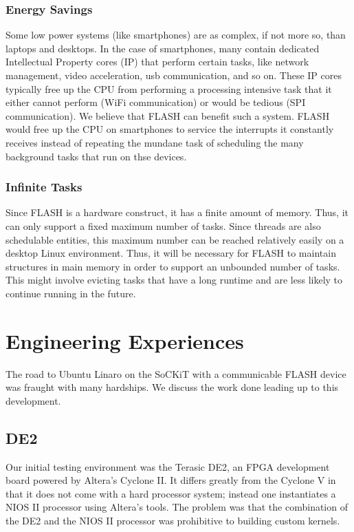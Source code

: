 \documentclass{sig-alternate-10pt}
\begin{document}
\subsubsection{Energy Savings}
Some low power systems (like smartphones) are as complex, if not more so,
than laptops and desktops. In the case of smartphones, many contain
dedicated Intellectual Property cores (IP) that perform certain tasks, like
network management, video acceleration, usb communication, and so on. These IP
cores typically free up the CPU from performing a processing intensive task
that it either cannot perform (WiFi communication) or would be tedious (SPI
communication). We believe that FLASH can benefit such a system. FLASH would
free up the CPU on smartphones to service the interrupts it constantly
receives instead of repeating the mundane task of scheduling the many
background tasks that run on thse devices.

\subsubsection{Infinite Tasks}
Since FLASH is a hardware construct, it has a finite amount of memory. Thus,
it can only support a fixed maximum number of tasks. Since threads are also
schedulable entities, this maximum number can be reached relatively easily
on a desktop Linux environment. Thus, it will be necessary for FLASH to
maintain structures in main memory in order to support an unbounded number
of tasks.  This might involve evicting tasks that have a long runtime and
are less likely to continue running in the future.


\section{Engineering Experiences}
\label{sec:eng_exp}
The road to Ubuntu Linaro on the SoCKiT with a communicable FLASH device was fraught with many hardships. We discuss the work done leading up to this development.
\subsection{DE2}
Our initial testing environment was the Terasic DE2, an FPGA development board powered by Altera's Cyclone II. It differs greatly from the Cyclone V in that it does not come with a hard processor system; instead one instantiates a NIOS II processor using Altera's tools. The problem was that the combination of the DE2 and the NIOS II processor was prohibitive to building custom kernels.
\end{document}
